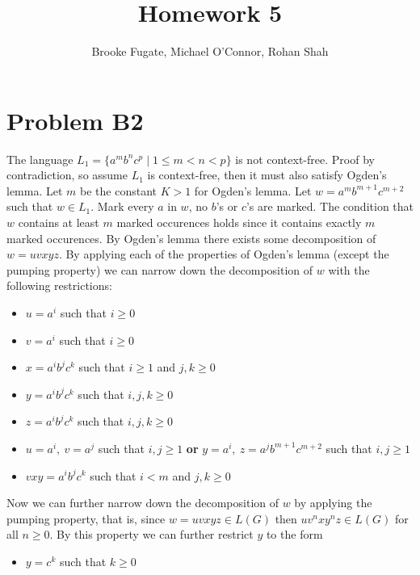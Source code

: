 \documentclass[12pt]{article}
\begin{document}
\pagestyle{plain}
\titleformat{\subsection}[runin]
  {\normalfont\large\bfseries}{\thesubsection}{1em}{}

\title{Homework 5}
\author{Brooke Fugate, Michael O'Connor, Rohan Shah}
\date{}

\maketitle

\section*{Problem B2}
The language $L_1 = \{a^mb^nc^p \mid 1\le m<n<p\}$ is not context-free. Proof by
contradiction, so assume $L_1$ is context-free, then it must also satisfy
Ogden's lemma. Let $m$ be the constant $K > 1$ for Ogden's lemma. Let
$w = a^mb^{m+1}c^{m+2}$ such that $w \in L_1$. Mark every $a$ in $w$,
no $b$'s or $c$'s are marked. The condition that $w$ contains at least $m$
marked occurences holds since it contains exactly $m$ marked occurences.
By Ogden's lemma there exists some decomposition of $w = uvxyz$. By applying
each of the properties of Ogden's lemma (except the pumping property) we can
narrow down the decomposition of $w$ with the following restrictions:
\begin{itemize}
\item $u=a^i$ such that $i\ge 0$
\item $v=a^i$ such that $i\ge 0$
\item $x=a^ib^jc^k$ such that $i\ge 1$ and $j,k\ge 0$
\item $y=a^ib^jc^k$ such that $i,j,k\ge 0$
\item $z=a^ib^jc^k$ such that $i,j,k\ge 0$
\item $u=a^i,\ v=a^j$ such that $i,j\ge 1$ \textbf{or}
$y=a^i,\ z=a^jb^{m+1}c^{m+2}$ such that $i,j\ge 1$
\item $vxy = a^ib^jc^k$ such that $i<m$ and $j,k\ge 0$
\end{itemize}
Now we can further narrow down the decomposition of $w$ by applying the pumping
property, that is, since $w = uvxyz \in L(G)$ then $uv^nxy^nz \in L(G)$ for all
$n \ge 0$. By this property we can further restrict $y$ to the form
\begin{itemize}
\item $y=c^k$ such that $k\ge 0$
\end{itemize}
\end{document}

